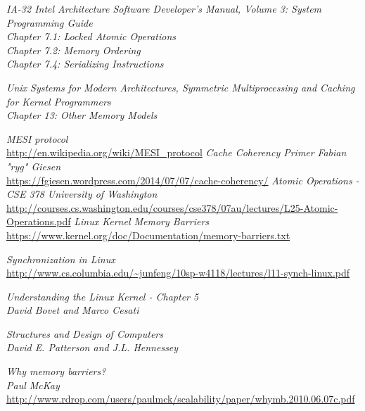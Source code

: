 \documentclass{article}
\begin{document}
\begin{thebibliography}{9}

  \textit{IA-32 Intel Architecture Software Developer's Manual, Volume 3:
    System Programming Guide} \\
  \textit{Chapter 7.1: Locked Atomic Operations} \\
  \textit{Chapter 7.2: Memory Ordering}  \\
  \textit{Chapter 7.4: Serializing Instructions}

  \textit{Unix Systems for Modern Architectures, Symmetric Multiprocessing and Caching
    for Kernel Programmers} \\
  \textit{Chapter 13: Other Memory Models}  
  
  \textit{MESI protocol}  \\
  \url{http://en.wikipedia.org/wiki/MESI_protocol}
  \textit{Cache Coherency Primer}  \textit{Fabian "ryg" Giesen} \\
  \url{https://fgiesen.wordpress.com/2014/07/07/cache-coherency/}
   \textit{Atomic Operations - CSE 378 University of Washington} \\
  \url{http://courses.cs.washington.edu/courses/cse378/07au/lectures/L25-Atomic-Operations.pdf}
  \textit{Linux Kernel Memory Barriers} \\
  \url{https://www.kernel.org/doc/Documentation/memory-barriers.txt}

  \textit{Synchronization in Linux} \\
  \url{http://www.cs.columbia.edu/~junfeng/10sp-w4118/lectures/l11-synch-linux.pdf}

  \textit{Understanding the Linux Kernel - Chapter 5} \\
  \textit{David Bovet and Marco Cesati}  

  \textit{Structures and Design of Computers } \\
  \textit{David E. Patterson and J.L. Hennessey} 
  
  \textit{Why memory barriers?} \\
  \textit{Paul McKay} \\
  \url{http://www.rdrop.com/users/paulmck/scalability/paper/whymb.2010.06.07c.pdf}
\end{thebibliography}
\end{document}

